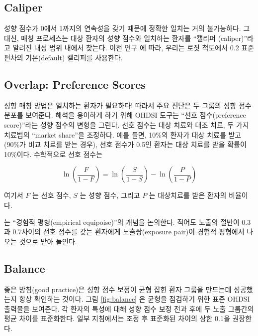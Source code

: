 \documentclass[11pt]{book}
\theoremstyle{definition}
\theoremstyle{definition}
\theoremstyle{definition}
\theoremstyle{remark}
\begin{document}
\subsection{Caliper}\label{caliper}


성향 점수가 0에서 1까지의 연속성을 갖기 때문에 정확한 일치는 거의
불가능하다. 그 대신, 매칭 프로세스는 대상 환자의 성향 점수와 일치하는
환자를 ``캘리퍼 (caliper)''라고 알려진 내성 범위 내에서 찾는다. 이전
연구 \citep{austin_2011}에 따라, 우리는 로짓 척도에서 0.2 표준편차의
기본(default) 캘리퍼를 사용한다.

\subsection{Overlap: Preference Scores}\label{overlap-preference-scores}


성향 매칭 방법은 일치하는 환자가 필요하다! 따라서 주요 진단은 두 그룹의
성향 점수 분포를 보여준다. 해석을 용이하게 하기 위해 OHDSI 도구는 ``선호
점수(preference score)''라는 성향 점수의 변형을 그린다.
\citep{walker_2013} 선호 점수는 대상 치료와 대조 치료, 두 가지 치료법의
``market share''을 조정하다. 예를 들면, 10\%의 환자가 대상 치료를
받고(90\%가 비교 치료를 받는 경우), 선호 점수가 0.5인 환자는 대상 치료를
받을 확률이 10\%이다. 수학적으로 선호 점수는

\[\ln\left(\frac{F}{1-F}\right)=\ln\left(\frac{S}{1-S}\right)-\ln\left(\frac{P}{1-P}\right)\]

여기서 \(F\) 는 선호 점수, \(S\) 는 성향 점수, 그리고 \(P\) 는
대상치료를 받은 환자의 비율이다.

\citet{walker_2013} 는 ``경험적 평형(empirical equipoise)''의 개념을
논의한다. 적어도 노출의 절반이 0.3과 0.7사이의 선호 점수를 갖는 환자에게
노출쌍(exposure pair)이 경험적 평형에서 나오는 것으로 받아 들인다.

\subsection{Balance}\label{balance}

 

좋은 방침(good practice)은 성향 점수 보정이 균형 잡힌 환자 그룹을
만드는데 성공했는지 항상 확인하는 것이다. 그림 \ref{fig:balance} 은
균형을 점검하기 위한 표준 OHDSI 출력물을 보여준다. 각 환자의 특성에 대해
성향 점수 보정 전과 후에 두 노출 그룹간의 평균 차이를 표준화한다. 일부
지침에서는 조정 후 표준화된 차이의 상한 0.1을 권장한다.
\citep{rubin_2001}
\end{document}

